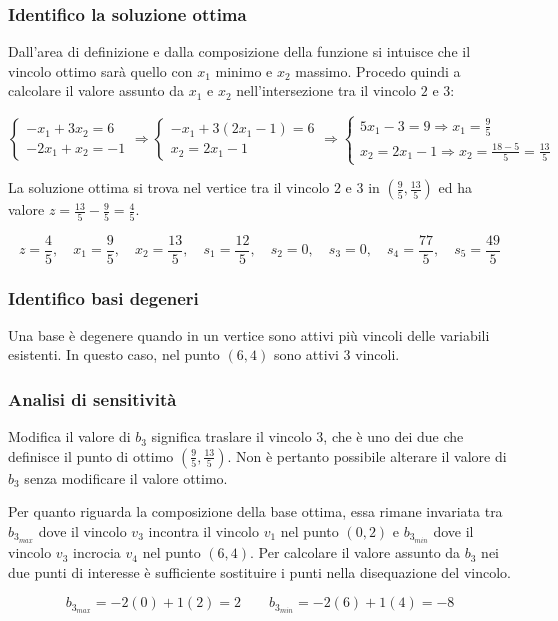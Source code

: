 \documentclass[\main/main.tex]{subfiles}
\begin{document}
\subsubsection*{Identifico la soluzione ottima}
Dall'area di definizione e dalla composizione della funzione si intuisce che il vincolo ottimo sarà quello con $x_1$ minimo e $x_2$ massimo. Procedo quindi a calcolare il valore assunto da $x_1$ e $x_2$ nell'intersezione tra il vincolo $2$ e $3$:

\[
  \begin{cases}
    -x_1 + 3x_2  = 6 \\
    -2x_1 + x_2  = -1
  \end{cases}
  \Rightarrow
  \begin{cases}
    -x_1 + 3(2x_1 -1)  = 6 \\
    x_2  =2x_1 -1
  \end{cases}
  \Rightarrow
  \begin{cases}
    5x_1 -3  = 9 \Rightarrow x_1 = \frac{9}{5} \\
    x_2  =2x_1 -1 \Rightarrow x_2 = \frac{18-5}{5} = \frac{13}{5}
  \end{cases}
\]

La soluzione ottima si trova nel vertice tra il vincolo $2$ e $3$ in $(\frac{9}{5}, \frac{13}{5})$ ed ha valore $z = \frac{13}{5} - \frac{9}{5} = \frac{4}{5}$.

\[
  z = \frac{4}{5}, \quad x_1 = \frac{9}{5}, \quad x_2 = \frac{13}{5}, \quad s_1 = \frac{12}{5}, \quad s_2 = 0, \quad s_3 = 0, \quad s_4 = \frac{77}{5}, \quad s_5 = \frac{49}{5}
\]

\subsubsection*{Identifico basi degeneri}
Una base è degenere quando in un vertice sono attivi più vincoli delle variabili esistenti. In questo caso, nel punto $(6,4)$ sono attivi 3 vincoli.

\subsubsection*{Analisi di sensitività}
Modifica il valore di $b_3$ significa traslare il vincolo $3$, che è uno dei due che definisce il punto di ottimo $(\frac{9}{5}, \frac{13}{5})$. Non è pertanto possibile alterare il valore di $b_3$ senza modificare il valore ottimo.

Per quanto riguarda la composizione della base ottima, essa rimane invariata tra $b_{3_{max}}$ dove il vincolo $v_3$ incontra il vincolo $v_1$ nel punto $(0,2)$ e $b_{3_{min}}$ dove il vincolo $v_3$ incrocia $v_4$ nel punto $(6,4)$. Per calcolare il valore assunto da $b_3$ nei due punti di interesse è sufficiente sostituire i punti nella disequazione del vincolo.

\[
  b_{3_{max}} = -2(0) + 1(2) = 2 \qquad b_{3_{min}} = -2(6) + 1(4) = -8
\]
\end{document}
